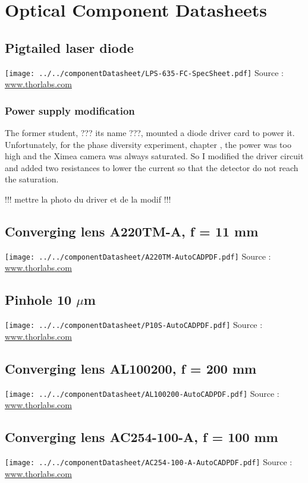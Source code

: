 
\chapter{Optical Component Datasheets}
\label{App:OptCompDatasheet} 

\section{Pigtailed laser diode}
\label{app:pigtailedLaserDiode}
\texttt{[image: ../../componentDatasheet/LPS-635-FC-SpecSheet.pdf]}
Source : \url{www.thorlabs.com}

\subsection{Power supply modification}

The former student, ??? its name ???, mounted a diode driver card to power it. Unfortunately, for the phase diversity experiment, chapter \label{ch:PDExp}, the power was too high and the Ximea camera was always saturated. So I modified the driver circuit and added two resistances to lower the current so that the detector do not reach the saturation.

!!! mettre la photo du driver et de la modif !!!

\section{Converging lens A220TM-A, f = 11 mm}
\label{app:CL11}
\texttt{[image: ../../componentDatasheet/A220TM-AutoCADPDF.pdf]}
Source : \url{www.thorlabs.com}

\section{Pinhole 10 $\mu$m}
\label{app:pinhole10microns}
\texttt{[image: ../../componentDatasheet/P10S-AutoCADPDF.pdf]}
Source : \url{www.thorlabs.com}

\section{Converging lens AL100200, f = 200 mm}
\label{app:CL200}
\texttt{[image: ../../componentDatasheet/AL100200-AutoCADPDF.pdf]}
Source : \url{www.thorlabs.com}

\section{Converging lens AC254-100-A, f = 100 mm}
\label{app:CL100}
\texttt{[image: ../../componentDatasheet/AC254-100-A-AutoCADPDF.pdf]}
Source : \url{www.thorlabs.com}

